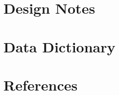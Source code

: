 \documentclass [10pt]{article}
\begin{document}
\section {Design Notes}

\section {Data Dictionary}

\section {References}
\end{document}
